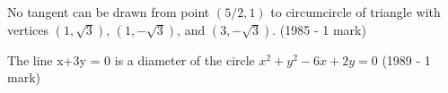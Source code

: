 \iffalse
\title{Circles}
\author{EE24Btech11022 - Eshan sharma}
\section{true-false}
\fi

    \item No tangent can be drawn from point $(5/2, 1)$ to circumcircle of triangle with vertices $(1, \sqrt{3})$, $(1, -\sqrt{3})$, and $(3, -\sqrt{3})$.
    \hfill{(1985 - 1 mark)}
    \item The line x+3y = 0 is a diameter of the circle $ x^{2} + y^{2} - 6x +2y = 0$
    \hfill{(1989 - 1 mark)}
%
